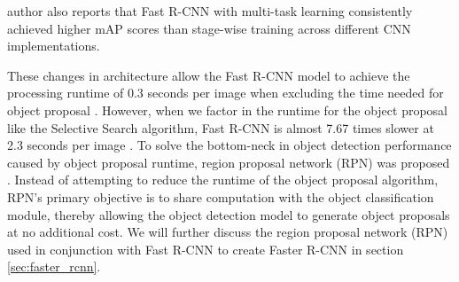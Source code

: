 author also reports that Fast R-CNN with multi-task learning consistently achieved higher mAP scores than stage-wise training across different CNN implementations.

    

These changes in architecture allow the Fast R-CNN model to achieve the processing runtime of 0.3 seconds per image when excluding the time needed for object proposal \cite{fast_rcnn_og}. However, when we factor in the runtime for the object proposal like the Selective Search algorithm, Fast R-CNN is almost 7.67 times slower at 2.3 seconds per image \cite{selective_search_2013}. To solve the bottom-neck in object detection performance caused by object proposal runtime, region proposal network (RPN) was proposed \cite{faster_rcnn_2015}. Instead of attempting to reduce the runtime of the object proposal algorithm, RPN's primary objective is to share computation with the object classification module, thereby allowing the object detection model to generate object proposals at no additional cost. We will further discuss the region proposal network (RPN) used in conjunction with Fast R-CNN to create Faster R-CNN in section \ref{sec:faster_rcnn}.